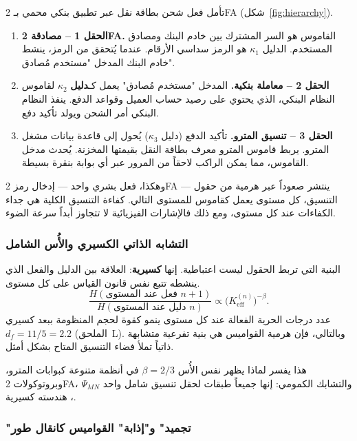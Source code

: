 \documentclass[12pt,a4paper]{article}
\theoremstyle{remark}
\begin{document}
	تأمل فعل شحن بطاقة نقل عبر تطبيق بنكي محمي بـ 2FA (شكل~\ref{fig:hierarchy}).
	
	\begin{enumerate}[leftmargin=*]
		\item \textbf{الحقل 1 -- مصادقة 2FA.}
		القاموس هو السر المشترك بين خادم البنك ومصادق المستخدم. الدليل \(\kappa_1\) هو الرمز سداسي الأرقام. عندما يُتحقق من الرمز، ينشط خادم البنك المدخل "مستخدم مُصادق".
		
		\item \textbf{الحقل 2 -- معاملة بنكية.}
		المدخل "مستخدم مُصادق" يعمل كـ\textbf{دليل} \(\kappa_2\) لقاموس النظام البنكي، الذي يحتوي على رصيد حساب العميل وقواعد الدفع. ينفذ النظام البنكي أمر الشحن ويولد تأكيد دفع.
		
		\item \textbf{الحقل 3 -- تنسيق المترو.}
		تأكيد الدفع (دليل \(\kappa_3\)) يُحول إلى قاعدة بيانات مشغل المترو. يربط قاموس المترو معرف بطاقة النقل بقيمتها المخزنة. يُحدث مدخل القاموس، مما يمكن الراكب لاحقاً من المرور عبر أي بوابة بنقرة بسيطة.
	\end{enumerate}
	
	وهكذا، فعل بشري واحد — إدخال رمز 2FA — ينتشر صعوداً عبر هرمية من حقول التنسيق، كل مستوى يعمل كقاموس للمستوى التالي. كفاءة التنسيق الكلية هي جداء الكفاءات عند كل مستوى، ومع ذلك فالإشارات الفيزيائية لا تتجاوز أبداً سرعة الضوء.
	
	\subsubsection{التشابه الذاتي الكسيري والأُس الشامل}
	
	البنية التي تربط الحقول ليست اعتباطية. إنها \textbf{كسيرية}: العلاقة بين الدليل والفعل الذي ينشطه تتبع نفس قانون القياس على كل مستوى.
	\[
	\frac{H(\text{فعل عند المستوى } n+1)}{H(\text{دليل عند المستوى } n)}
	\propto \bigl(K_{\mathrm{eff}}^{(n)}\bigr)^{-\beta}.
	\]
	عدد درجات الحرية الفعالة عند كل مستوى ينمو كقوة لحجم المنظومة ببعد كسيري \(d_f = 11/5 = 2.2\) (الملحق~L). وبالتالي، فإن هرمية القواميس هي بنية تفرعية متشابهة ذاتياً تملأ فضاء التنسيق المتاح بشكل أمثل.
	
	هذا يفسر لماذا يظهر نفس الأُس \(\beta=2/3\) في أنظمة متنوعة كبوابات المترو، وبروتوكولات 2FA، والتشابك الكمومي: إنها جميعاً طبقات لحقل تنسيق شامل واحد \(\Psi_{MN}\)، هندسته كسيرية.
	
	\subsubsection{"تجميد" و"إذابة" القواميس كانقال طور}
	
\end{document}
